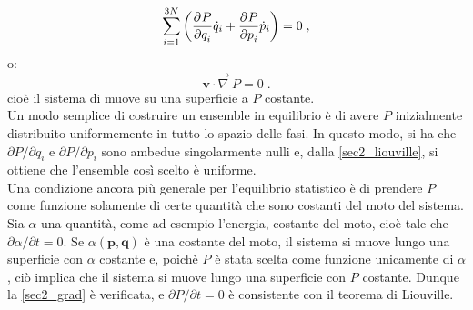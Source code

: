\begin{equation}
 \sum_{i=1}^{3N}\left(\frac{\partial^{}P}{\partial q_i^{}}\dot{q}_i+\frac{\partial^{}P}{\partial p_i^{}}\dot{p}_i\right)=0\;,
\end{equation}
o:
\begin{equation}
 \mathbf{v}\cdot\vec{\nabla}\;P=0\;. \label{sec2_grad}
\end{equation}
cioè il sistema di muove su una superficie a $P$ costante. \\

Un modo semplice di costruire un ensemble in equilibrio è di avere $P$ inizialmente distribuito uniformemente in tutto lo spazio delle 
fasi. In questo modo, si ha che $\partial P/\partial q_i$ e $\partial P/\partial p_i$ sono ambedue singolarmente nulli e, dalla \eqref{sec2_liouville}, si ottiene che l'ensemble così scelto è uniforme. \\
Una condizione ancora più generale per l'equilibrio statistico è di prendere $P$ come funzione solamente di certe quantità che sono 
costanti del moto del sistema. Sia $\alpha$ una quantità, come ad esempio l'energia, costante del moto, cioè tale che $\partial\alpha/
\partial t=0$. Se $\alpha(\mathbf{p},\mathbf{q})$ è una costante del moto, il sistema si muove lungo una superficie con $\alpha$ 
costante e, poichè $P$ è stata scelta come funzione unicamente di $\alpha$, ciò implica che il sistema si muove lungo una superficie con 
$P$ costante. Dunque la \eqref{sec2_grad} è verificata, e $\partial P/\partial t=0$ è consistente con il teorema di Liouville.
\pagebreak
